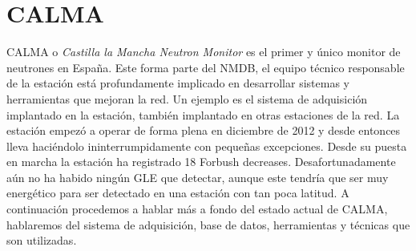 \section{CALMA}
	CALMA\cite{Medina2013} o \emph{Castilla la Mancha Neutron Monitor} es el primer y único monitor de neutrones en España. Este forma parte del
	NMDB, el equipo técnico responsable de la estación está profundamente implicado en desarrollar sistemas y herramientas que mejoran la red. Un
	ejemplo es el sistema de adquisición implantado en la estación, también implantado en otras estaciones de la red. La estación empezó a operar
	de forma plena en diciembre de 2012 y desde entonces lleva haciéndolo ininterrumpidamente con pequeñas excepciones. Desde su puesta en marcha
	la estación ha registrado 18 Forbush decreases. Desafortunadamente aún no ha habido ningún GLE que detectar, aunque este tendría que ser muy
	energético para ser detectado en una estación con tan poca latitud. A continuación procedemos a hablar más a fondo del estado actual de CALMA,
	hablaremos del sistema de adquisición, base de datos, herramientas y técnicas que son utilizadas.
